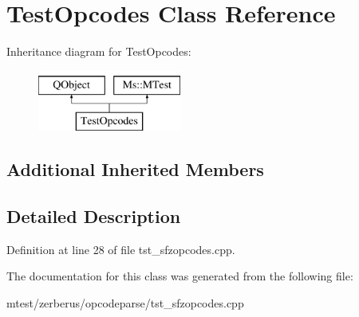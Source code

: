 \hypertarget{class_test_opcodes}{}\section{Test\+Opcodes Class Reference}
\label{class_test_opcodes}
Inheritance diagram for Test\+Opcodes\+:\begin{figure}[H]
\begin{center}
\leavevmode
\includegraphics[height=2.000000cm]{class_test_opcodes}
\end{center}
\end{figure}
\subsection*{Additional Inherited Members}


\subsection{Detailed Description}


Definition at line 28 of file tst\+\_\+sfzopcodes.\+cpp.



The documentation for this class was generated from the following file\+:\begin{DoxyCompactItemize}
\item 
mtest/zerberus/opcodeparse/tst\+\_\+sfzopcodes.\+cpp\end{DoxyCompactItemize}

